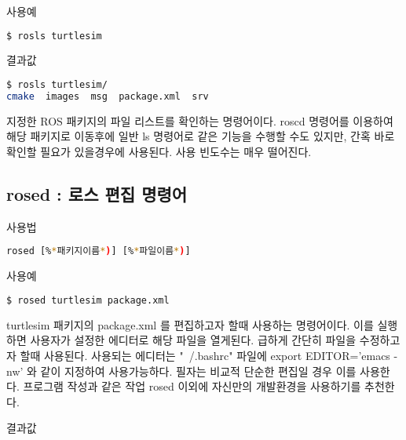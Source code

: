 \noindent
{}\circled{\thenum} 사용예
\begin{lstlisting}[language=bash]
$ rosls turtlesim
\end{lstlisting}

\noindent
{}\circled{\thenum} 결과값
\begin{lstlisting}[language=bash]
$ rosls turtlesim/
cmake  images  msg  package.xml  srv
\end{lstlisting}

\vspace{\baselineskip}
\noindent
지정한 ROS 패키지의 파일 리스트를 확인하는 명령어이다. roscd 명령어를 이용하여 해당 패키지로 이동후에 일반 ls 명령어로 같은 기능을 수행할 수도 있지만, 간혹 바로 확인할 필요가 있을경우에 사용된다. 사용 빈도수는 매우 떨어진다.

\subsection{rosed : 로스 편집 명령어}

\setcounter{num}{0}

\circled{\thenum} 사용법
\begin{lstlisting}[language=bash]
rosed [%*패키지이름*)] [%*파일이름*)]
\end{lstlisting}

\noindent
{}\circled{\thenum} 사용예
\begin{lstlisting}[language=bash]
$ rosed turtlesim package.xml 
\end{lstlisting}

\vspace{\baselineskip}
\noindent
turtlesim 패키지의 package.xml 를 편집하고자 할때 사용하는 명령어이다. 이를 실행하면 사용자가 설정한 에디터로 해당 파일을 열게된다. 급하게 간단히 파일을 수정하고자 할때 사용된다. 사용되는 에디터는 "~/.bashrc" 파일에 export EDITOR='emacs -nw' 와 같이 지정하여 사용가능하다. 필자는 비교적 단순한 편집일 경우 이를 사용한다. 프로그램 작성과 같은 작업 rosed 이외에 자신만의 개발환경을 사용하기를 추천한다.

\vspace{\baselineskip}
\noindent
{}\circled{\thenum} 결과값
\begin{lstlisting}[language=bash]
%*사용자가 지정해둔 에디터를 이용하여 해당 파일을 열게된다.*)
\end{lstlisting}

